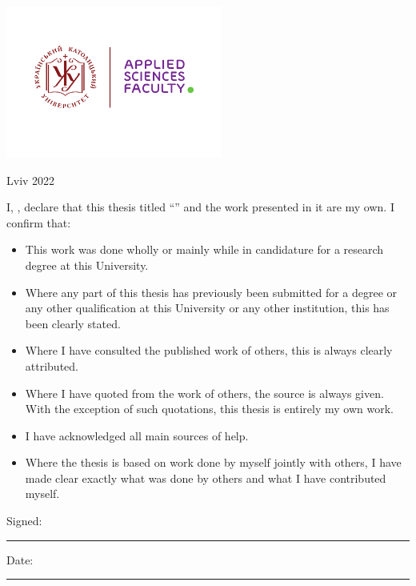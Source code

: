 \documentclass[
11pt, %
english, %
singlespacing, %
liststotoc, %
toctotoc, %
headsepline, %
]{BachelorMasterThesis} %
\begin{document}
\begin{titlepage}
\begin{center}
\vfill
\includegraphics[height=5cm]{UCU-Apps.png} %

\vfill
{\large \vspace{-0.5cm} Lviv 2022}\\[4cm] %
 
\vfill
\end{center}
\end{titlepage}


\begin{declaration}
\addchaptertocentry{\authorshipname} %
\noindent I, \authorname, declare that this thesis titled \enquote{\ttitle} and the work presented in it are my own. I confirm that:

\begin{itemize} 
\item This work was done wholly or mainly while in candidature for a research degree at this University.
\item Where any part of this thesis has previously been submitted for a degree or any other qualification at this University or any other institution, this has been clearly stated.
\item Where I have consulted the published work of others, this is always clearly attributed.
\item Where I have quoted from the work of others, the source is always given. With the exception of such quotations, this thesis is entirely my own work.
\item I have acknowledged all main sources of help.
\item Where the thesis is based on work done by myself jointly with others, I have made clear exactly what was done by others and what I have contributed myself.\\
\end{itemize}
 
\noindent Signed:\\
\rule[0.5em]{25em}{0.5pt} %
 
\noindent Date:\\
\rule[0.5em]{25em}{0.5pt} %
\end{declaration}
\end{document}
